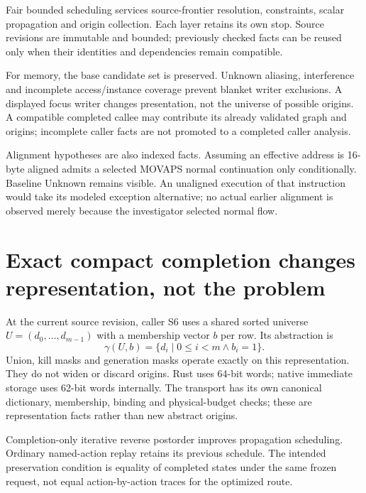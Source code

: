 \documentclass[11pt,a4paper]{article}
\newcommand{\code}[1]{\texttt{\detokenize{#1}}}
\begin{document}
Fair bounded scheduling services source-frontier resolution, constraints,
scalar propagation and origin collection. Each layer retains its own stop.
Source revisions are immutable and bounded; previously checked facts can be
reused only when their identities and dependencies remain compatible.

For memory, the base candidate set is preserved. Unknown aliasing,
interference and incomplete access/instance coverage prevent blanket writer
exclusions. A displayed focus writer changes presentation, not the universe
of possible origins. A compatible completed callee may contribute its already
validated graph and origins; incomplete caller facts are not promoted to a
completed caller analysis.

Alignment hypotheses are also indexed facts. Assuming an effective address is
16-byte aligned admits a selected MOVAPS normal continuation only conditionally.
Baseline Unknown remains visible. An unaligned execution of that instruction
would take its modeled exception alternative; no actual earlier alignment is
observed merely because the investigator selected normal flow.

\section{Exact compact completion changes representation, not the problem}
\label{app:completion}
At the current source revision, caller S6 uses a shared sorted universe
$U=(d_0,\ldots,d_{m-1})$ with a membership vector $b$ per row. Its abstraction is
\[
 \gamma(U,b)=\{d_i\mid0\le i<m\land b_i=1\}.
\]
Union, kill masks and generation masks operate exactly on this representation.
They do not widen or discard origins. Rust uses 64-bit words; native immediate
storage uses 62-bit words internally. The \code{bitmap/v1} transport has its own
canonical dictionary, membership, binding and physical-budget checks; these
are representation facts rather than new abstract origins.

Completion-only iterative reverse postorder improves propagation scheduling.
Ordinary named-action replay retains its previous schedule. The intended
preservation condition is equality of completed states under the same frozen
request, not equal action-by-action traces for the optimized route.
\end{document}

